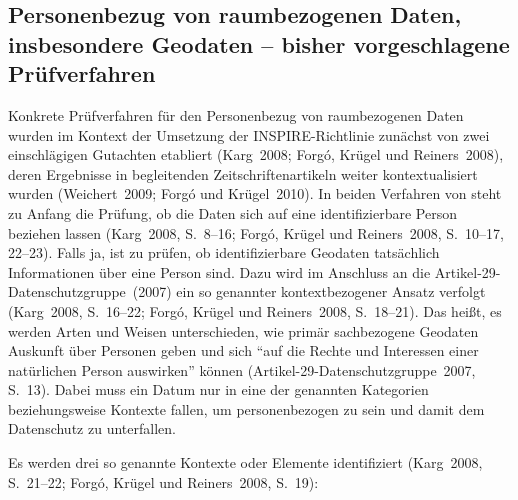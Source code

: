 \documentclass[a4paper,
fontsize=11pt,
oneside,
numbers=noperiodatend,
parskip=half-,
bibliography=totoc,
final
]{scrartcl}
\begin{document}
\hypertarget{personenbezug-von-raumbezogenen-daten-insbesondere-geodaten-bisher-vorgeschlagene-pruxfcfverfahren}{%
\subsection{Personenbezug von raumbezogenen Daten, insbesondere Geodaten -- bisher vorgeschlagene Prüfverfahren}\label{personenbezug-von-raumbezogenen-daten-insbesondere-geodaten-bisher-vorgeschlagene-pruxfcfverfahren}}

Konkrete Prüfverfahren für den Personenbezug von raumbezogenen Daten
wurden im Kontext der Umsetzung der INSPIRE-Richtlinie zunächst von zwei
einschlägigen Gutachten etabliert (Karg~2008; Forgó, Krügel und
Reiners~2008), deren Ergebnisse in begleitenden Zeitschriftenartikeln
weiter kontextualisiert wurden (Weichert~2009; Forgó und Krügel~2010).
In beiden Verfahren von steht zu Anfang die Prüfung, ob die Daten sich
auf eine identifizierbare Person beziehen lassen (Karg~2008, S.~8--16;
Forgó, Krügel und Reiners~2008, S.~10--17, 22--23). Falls ja, ist zu
prüfen, ob identifizierbare Geodaten tatsächlich Informationen über eine
Person sind. Dazu wird im Anschluss an die
Artikel-29-Datenschutzgruppe~(2007) ein so genannter kontextbezogener
Ansatz verfolgt (Karg~2008, S.~16--22; Forgó, Krügel und Reiners~2008,
S.~18--21). Das heißt, es werden Arten und Weisen unterschieden, wie
primär sachbezogene Geodaten Auskunft über Personen geben und sich
\enquote{auf die Rechte und Interessen einer natürlichen Person
auswirken} können (Artikel-29-Datenschutzgruppe~2007, S.~13). Dabei muss
ein Datum nur in eine der genannten Kategorien beziehungsweise Kontexte
fallen, um personenbezogen zu sein und damit dem Datenschutz zu
unterfallen.

Es werden drei so genannte Kontexte oder Elemente identifiziert
(Karg~2008, S.~21--22; Forgó, Krügel und Reiners~2008, S.~19):
\end{document}
